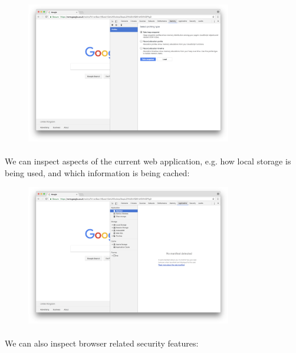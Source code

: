 \begin{figure}[H]
\centering
\includegraphics[width=0.8\textwidth]{figures/devtools-memory.png}
\label{fig:devtools-memory}
\end{figure}


\paragraph{} We can inspect aspects of the current web application, e.g. how local storage is being used, and which information is being cached:

\begin{figure}[H]
\centering
\includegraphics[width=0.8\textwidth]{figures/devtools-application.png}
\label{fig:devtools-application}
\end{figure}


\paragraph{} We can also inspect browser related security features:

